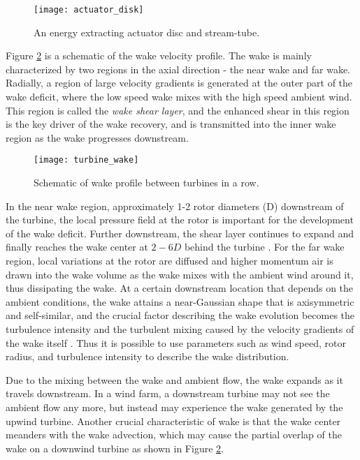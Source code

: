 \documentclass{umthesis}
\begin{document}
\begin{figure}
  \centering
  \texttt{[image: actuator\_disk]}
  \caption{An energy extracting actuator disc and stream-tube.}\label{fig:actuator_disk}
\end{figure}

Figure \ref{fig:wake} is a schematic of the wake velocity profile. The wake is mainly characterized by two regions in the axial direction - the near wake and far wake. Radially, a region of large velocity gradients is generated at the outer part of the wake deficit, where the low speed wake mixes with the high speed ambient wind. This region is called the \textit{wake shear layer}, and the enhanced shear in this region is the key driver of the wake recovery, and is transmitted into the inner wake region as the wake progresses downstream.

\begin{figure}
  \centering
  \texttt{[image: turbine\_wake]}
  \caption{Schematic of wake profile between turbines in a row.}\label{fig:wake}
\end{figure}


In the near wake region, approximately 1-2 rotor diameters (D) downstream of the turbine, the local pressure field at the rotor is important for the development of the wake deficit. Further downstream, the shear layer continues to expand and finally reaches the wake center at $2-6D$ behind the turbine \cite{Aerodynamics}. For the far wake region, local variations at the rotor are diffused and higher momentum air is drawn into the wake volume as the wake mixes with the ambient wind around it, thus dissipating the wake. At a certain downstream location that depends on the ambient conditions, the wake attains a near-Gaussian shape that is axisymmetric and self-similar, and the crucial factor describing the wake evolution becomes the turbulence intensity and the turbulent mixing caused by the velocity gradients of the wake itself \cite{Meteorological_controls}. Thus it is possible to use parameters such as wind speed, rotor radius, and turbulence intensity to describe the wake distribution.

Due to the mixing between the wake and ambient flow, the wake expands as it travels downstream. In a wind farm, a downstream turbine may not see the ambient flow any more, but instead may experience the wake generated by the upwind turbine. Another crucial characteristic of wake is that the wake center meanders with the wake advection, which may cause the partial overlap of the wake on a downwind turbine as shown in Figure \ref{fig:wake}.
\end{document}
